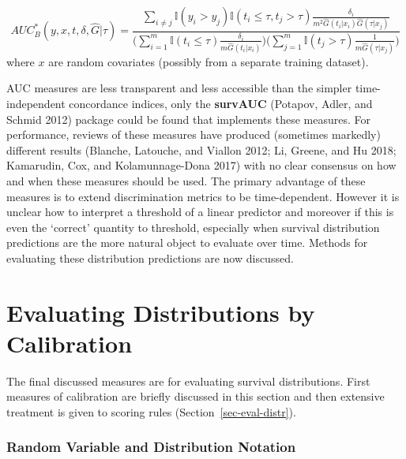 \documentclass[
  letterpaper,
]{scrbook}
\theoremstyle{plain}
\theoremstyle{definition}
\theoremstyle{remark}
\begin{document}
\[
AUC^*_B(y, x, t, \delta, \hat{G}|\tau) = \frac{\sum_{i \neq j} \mathbb{I}(y_i > y_j)\mathbb{I}(t_i \leq \tau, t_j > \tau)\frac{\delta_i}{m^2\hat{G}(t_i|x_i)\hat{G}(\tau|x_j)}}{\Big(\sum^m_{i=1}\mathbb{I}(t_i \leq \tau)\frac{\delta_i}{m\hat{G}(t_i|x_i)}\Big)\Big(\sum^m_{j=1}\mathbb{I}(t_j>\tau)\frac{1}{m\hat{G}(\tau|x_j)}\Big)}
\] where \(x\) are random covariates (possibly from a separate training
dataset).

AUC measures are less transparent and less accessible than the simpler
time-independent concordance indices, only the \textbf{survAUC}
(Potapov, Adler, and Schmid 2012) package could be found that implements
these measures. For performance, reviews of these measures have produced
(sometimes markedly) different results (Blanche, Latouche, and Viallon
2012; Li, Greene, and Hu 2018; Kamarudin, Cox, and Kolamunnage-Dona
2017) with no clear consensus on how and when these measures should be
used. The primary advantage of these measures is to extend
discrimination metrics to be time-dependent. However it is unclear how
to interpret a threshold of a linear predictor and moreover if this is
even the `correct' quantity to threshold, especially when survival
distribution predictions are the more natural object to evaluate over
time. Methods for evaluating these distribution predictions are now
discussed.

\hypertarget{sec-eval-distr-calib}{%
\section{Evaluating Distributions by
Calibration}\label{sec-eval-distr-calib}}

The final discussed measures are for evaluating survival distributions.
First measures of calibration are briefly discussed in this section and
then extensive treatment is given to scoring rules
(Section~\ref{sec-eval-distr}).

\hypertarget{random-variable-and-distribution-notation}{%
\subsubsection*{Random Variable and Distribution
Notation}\label{random-variable-and-distribution-notation}}
\end{document}
